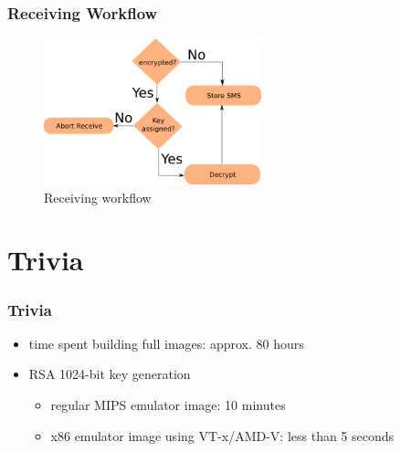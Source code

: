 \documentclass{beamer}
\begin{document}
	\begin{frame}
		\frametitle{Receiving Workflow}%
		\begin{algorithmic}
		\end{algorithmic}
		\begin{figure}[h]
			\centering
			\includegraphics[width=17em]{sms_receive}
			\caption{Receiving workflow}
			\label{fig:receive}
		\end{figure}
	\end{frame}

	
\section{Trivia}
	\begin{frame}
		\tableofcontents[currentsection]
	\end{frame}
	\begin{frame}
	\frametitle{Trivia}
		\begin{itemize}
			\item time spent building full images: approx. 80 hours
			\item RSA 1024-bit key generation
				\begin{itemize}
					\item regular MIPS emulator image: 10 minutes
					\item x86 emulator image using VT-x/AMD-V: less than 5 seconds
				\end{itemize}
		\end{itemize}
	\end{frame}
\end{document}
